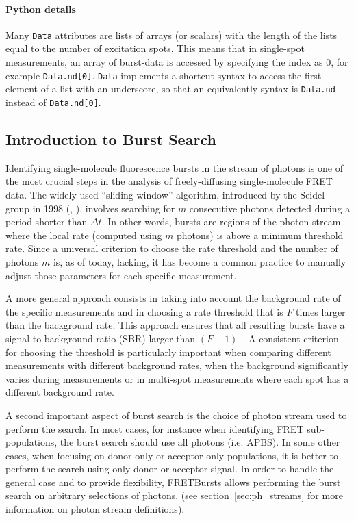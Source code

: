 \paragraph{Python details}
Many \verb|Data| attributes are lists of arrays (or scalars) with the length of the lists
equal to the number of excitation spots. This means that in
single-spot measurements, an array of burst-data
is accessed by specifying the index as 0, for example \verb|Data.nd[0]|.
\verb|Data| implements a shortcut syntax to access the first element of a list
with an underscore, so that an equivalently syntax is
\verb|Data.nd_| instead of \verb|Data.nd[0]|.

\subsection{Introduction to Burst Search}
\label{sec:burstsearch_intro}

Identifying single-molecule fluorescence bursts in the stream of photons is
one of the most crucial steps in the analysis of freely-diffusing single-molecule FRET data.
The widely used ``sliding window'' algorithm, introduced by the Seidel group in 1998
(\cite{Eggeling_1998}, \cite{Fries_1998}), involves searching for
$m$ consecutive photons detected during a period shorter than
$\Delta t$. In other words, bursts are regions of the photon stream where the
local rate (computed using $m$ photons) is above a minimum threshold rate.
Since a universal criterion to choose the rate threshold and
the number of photons $m$ is, as of today, lacking, it has become a common
practice to manually adjust those parameters for each specific measurement.

A more general approach consists in taking into account the background rate of
the specific measurements and in choosing a rate threshold that is $F$ times
larger than the background rate. This approach ensures that all resulting bursts
have a signal-to-background ratio (SBR) larger than
$(F-1)$~\cite{Michalet_2012}. A consistent criterion for choosing the threshold is
particularly important when comparing different measurements with different background
rates, when the background significantly varies during measurements or in
multi-spot measurements where each spot has a different background rate.

A second important aspect of burst search is the choice of photon stream used
to perform the search.
In most cases, for instance when identifying FRET sub-populations,
the burst search should use all photons (i.e. APBS). In some other cases, when focusing on
donor-only or acceptor only populations, it is better to perform the search using
only donor or acceptor signal.
In order to handle the general case and to provide flexibility,
FRETBursts allows performing the burst search on arbitrary selections of photons.
(see section~\ref{sec:ph_streams} for more information on photon stream definitions).

